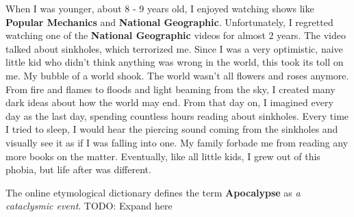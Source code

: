 \begin{essay}
  When I was younger, about $8$ - $9$ years old, I enjoyed watching shows like
  \textbf{Popular Mechanics} and \textbf{National Geographic}. Unfortunately, I
  regretted watching one of the \textbf{National Geographic} videos for almost
  $2$ years. The video talked about sinkholes, which terrorized me. Since I was
  a very optimistic, naive little kid who didn't think anything was wrong in the
  world, this took its toll on me. My bubble of a world shook. The world wasn't
  all flowers and roses anymore. From fire and flames to floods and light
  beaming from the sky, I created many dark ideas about how the world may end.
  From that day on, I imagined every day as the last day, spending countless
  hours reading about sinkholes. Every time I tried to sleep, I would hear the
  piercing sound coming from the sinkholes and visually see it as if I was
  falling into one. My family forbade me from reading any more books on the
  matter. Eventually, like all little kids, I grew out of this phobia, but life
  after was different.

  The online etymological dictionary defines the term \textbf{Apocalypse} as
  \textit{a cataclysmic event}. TODO: Expand here


\end{essay}

